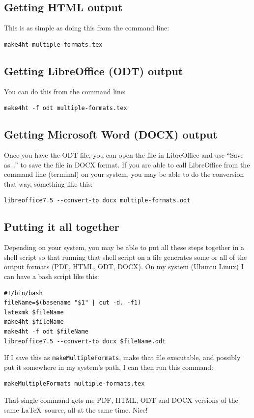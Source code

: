 \documentclass[a4paper,12pt]{article}
\begin{document}
\subsection{Getting HTML output}

This is as simple as doing this from the command line:
\begin{verbatim}
make4ht multiple-formats.tex
\end{verbatim}

\subsection{Getting LibreOffice (ODT) output}

You can do this from the command line:
\begin{verbatim}
make4ht -f odt multiple-formats.tex
\end{verbatim}

\subsection{Getting Microsoft Word (DOCX) output}
\label{msword}
Once you have the ODT file, you can open the file in LibreOffice and
use ``Save as...'' to save the file in DOCX format.  If you are able
to call LibreOffice from the command line (terminal) on your system,
you may be able to do the conversion that way, something like this:
\begin{verbatim}
libreoffice7.5 --convert-to docx multiple-formats.odt
\end{verbatim}

\subsection{Putting it all together}

Depending on your system, you may be able to put all these steps
together in a shell script so that running that shell script on a
file generates some or all of the output formats (PDF, HTML, ODT,
DOCX). On my system (Ubuntu Linux) I can have a bash script like this:
\begin{verbatim}
#!/bin/bash
fileName=$(basename "$1" | cut -d. -f1)
latexmk $fileName
make4ht $fileName
make4ht -f odt $fileName
libreoffice7.5 --convert-to docx $fileName.odt
\end{verbatim}
If I save this as \verb!makeMultipleFormats!, make that file
executable, and possibly put it somewhere in my system's path, I can
then run this command:
\begin{verbatim}
makeMultipleFormats multiple-formats.tex
\end{verbatim}
That single command gets me PDF, HTML, ODT and DOCX versions of the
same \LaTeX\ source, all at the same time. Nice!
\end{document}
